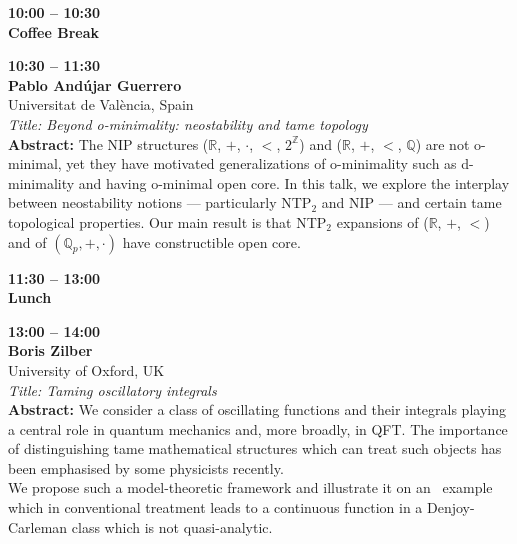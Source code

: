\documentclass[10pt,a4paper]{article}
\begin{document}
\begin{tcolorbox}[talkbox]
\textbf{10:00 -- 10:30} \\
\textbf{Coffee Break}
\end{tcolorbox}

\begin{tcolorbox}[talkbox]
\textbf{10:30 -- 11:30} \\
\textbf{Pablo Andújar Guerrero} \\
Universitat de València, Spain \\
\textit{Title: Beyond o-minimality: neostability and tame topology} \\
\textbf{Abstract:} The NIP structures ($\mathbb{R}$, $+$, $\cdot$, $<$, $2^\mathbb{Z}$) and ($\mathbb{R}$, $+$, $<$, $\mathbb{Q}$) are not o-minimal, yet they have motivated generalizations of o-minimality such as d-minimality and having o-minimal open core. In this talk, we explore the interplay between neostability notions --- particularly NTP$_2$ and NIP --- and certain tame topological properties. Our main result is that NTP$_2$ expansions of ($\mathbb{R}$, $+$, $<$) and of $(\mathbb{Q}_p, +, \cdot)$ have constructible open core.
\end{tcolorbox}

\begin{tcolorbox}[talkbox]
\textbf{11:30 -- 13:00} \\
\textbf{Lunch}
\end{tcolorbox}

\begin{tcolorbox}[talkbox]
\textbf{13:00 -- 14:00} \\
\textbf{Boris Zilber} \\
University of Oxford, UK \\
\textit{Title: Taming oscillatory integrals} \\
\textbf{Abstract:} We consider a class of oscillating functions and their integrals  playing a central role in quantum mechanics and, more broadly, in QFT. The importance of distinguishing tame mathematical structures which can treat such objects has been emphasised by some physicists recently.\\

We propose such a model-theoretic framework and illustrate it on an  example which in conventional treatment leads to a continuous function in a Denjoy-Carleman class which is not quasi-analytic.  
\end{tcolorbox}
\end{document}
